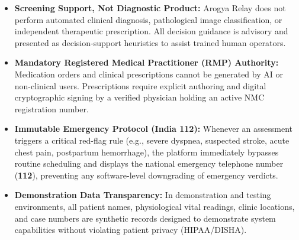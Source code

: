 \documentclass[12pt,a4paper,oneside]{report}
\begin{document}
\begin{itemize}[leftmargin=1.5em,itemsep=1pt,topsep=1pt,parsep=0pt]
    \item \textbf{Screening Support, Not Diagnostic Product:} Arogya Relay does not perform automated clinical diagnosis, pathological image classification, or independent therapeutic prescription. All decision guidance is advisory and presented as decision-support heuristics to assist trained human operators.
    \item \textbf{Mandatory Registered Medical Practitioner (RMP) Authority:} Medication orders and clinical prescriptions cannot be generated by AI or non-clinical users. Prescriptions require explicit authoring and digital cryptographic signing by a verified physician holding an active NMC registration number.
    \item \textbf{Immutable Emergency Protocol (India 112):} Whenever an assessment triggers a critical red-flag rule (e.g., severe dyspnea, suspected stroke, acute chest pain, postpartum hemorrhage), the platform immediately bypasses routine scheduling and displays the national emergency telephone number (\textbf{112}), preventing any software-level downgrading of emergency verdicts.
    \item \textbf{Demonstration Data Transparency:} In demonstration and testing environments, all patient names, physiological vital readings, clinic locations, and case numbers are synthetic records designed to demonstrate system capabilities without violating patient privacy (HIPAA/DISHA).
\end{itemize}
\end{document}
